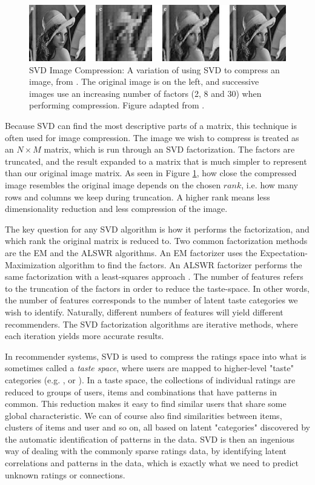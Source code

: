 \begin{figure}[t]
  \includegraphics[width=\textwidth]{../graphics/compression}
  \caption[SVD Image Compression]{
    SVD Image Compression:
    A variation of using SVD to compress an image, from \cite{Ranade2007}.
    The original image is on the left, and successive images use an increasing number of factors (2, 8 and 30) when performing compression.
    Figure adapted from \citet[p4]{Ranade2007}.
  }
  \label{fig:svd-image}
\end{figure}

Because SVD can find the most descriptive parts of a matrix, this technique is often used for image compression.
The image we wish to compress is treated as an $N \times M$ matrix, which is run through an SVD factorization.
The factors are truncated, and the result expanded to a matrix that is much simpler to represent
than our original image matrix. As seen in Figure \ref{fig:svd-image}, how close the compressed image resembles the original image
depends on the chosen $rank$, i.e. how many rows and columns we keep during truncation.
A higher rank means less dimensionality reduction and less compression of the image.

The key question for any SVD algorithm is how it performs the factorization,
and which rank the original matrix is reduced to.
Two common factorization methods are the EM and the ALSWR algorithms.
An EM factorizer uses the Expectation-Maximization algorithm to find the factors.
An ALSWR factorizer performs the same factorization with a least-squares approach \citep{Zhou2008}.
The number of features refers to the truncation of the factors in order to reduce the taste-space.
In other words, the number of features corresponds to the number of latent taste categories
we wish to identify.
Naturally, different numbers of features will yield different recommenders.
The SVD factorization algorithms are iterative methods, where each iteration
yields more accurate results.

In recommender systems, SVD is used to compress the ratings space into what is sometimes called a \emph{taste space},
where users are mapped to higher-level "taste" categories
(e.g. \citet[p5]{Ahn2004}, \citet[p4]{Brand2003} or \citet[p2]{Liu2006}).
In a taste space,
the collections of individual ratings are reduced to groups of users, items and combinations that have patterns in common.
This reduction makes it easy to find similar users that share some global characteristic.
We can of course also find similarities between items, clusters of items and user and so on, all based on latent "categories"
discovered by the automatic identification of patterns in the data.
SVD is then an ingenious way of dealing with the commonly sparse ratings data, by identifying latent correlations and patterns in the data,
which is exactly what we need to predict unknown ratings or connections.

